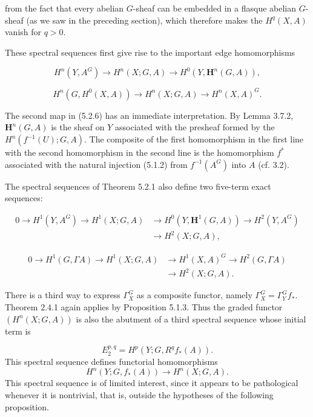 \clearpage
{}

\noindent from the fact that every abelian $G$-sheaf can be embedded in a
flasque abelian $G$-sheaf (as we saw in the preceding section), which therefore
makes the $H^q(X,A)$ vanish for $q>0$.

These spectral sequences first give rise to the important edge homomorphisms

\[
H^n(Y,A^G)\to H^n(X;G,A)
\to H^0(Y,\mathbf H^n(G,A)),
\tag{5.2.6}
\]

\[
H^n(G,H^0(X,A))\to H^n(X;G,A)
\to H^n(X,A)^G.
\tag{5.2.7}
\]

The second map in (5.2.6) has an immediate interpretation. By Lemma 3.7.2,
$\mathbf H^n(G,A)$ is the sheaf on $Y$ associated with the presheaf formed by
the $H^n(f^{-1}(U);G,A)$. The composite of the first homomorphism in the first
line with the second homomorphism in the second line is the homomorphism
$f^*$ associated with the natural injection (5.1.2) from $f^{-1}(A^G)$ into
$A$ (cf. 3.2).

The spectral sequences of Theorem 5.2.1 also define two five-term exact
sequences:

\[
\tag{5.2.8}
\begin{aligned}
0\to H^1(Y,A^G)\to H^1(X;G,A)
&\to H^0(Y,\mathbf H^1(G,A))\to H^2(Y,A^G)\\
&\to H^2(X;G,A),
\end{aligned}
\]

\[
\tag{5.2.9}
\begin{aligned}
0\to H^1(G,\Gamma A)\to H^1(X;G,A)
&\to H^1(X,A)^G\to H^2(G,\Gamma A)\\
&\to H^2(X;G,A).
\end{aligned}
\]

There is a third way to express $\Gamma_X^G$ as a composite functor, namely
$\Gamma_X^G=\Gamma_Y^Gf_*$. Theorem 2.4.1 again applies by Proposition 5.1.3.
Thus the graded functor $(H^n(X;G,A))$ is also the abutment of a third spectral
sequence whose initial term is

\[
E_2^{p,q}=H^p(Y;G,R^qf_*(A)).
\]
This spectral sequence defines functorial homomorphisms
\[
H^n(Y;G,f_*(A))\to H^n(X;G,A).
\tag{5.2.10}
\]
This spectral sequence is of limited interest, since it appears to be
pathological whenever it is nontrivial, that is, outside the hypotheses of
the following proposition.

